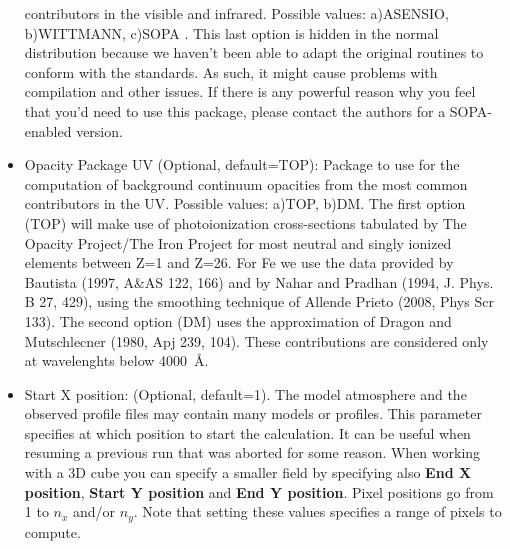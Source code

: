 \begin{itemize}
  contributors in the visible and infrared. Possible values:
  a)ASENSIO, b)WITTMANN, c)SOPA . This last option is hidden in the
  normal distribution because we haven't been able to adapt the
  original routines to conform with the standards. As such, it might
  cause problems with compilation and other issues. If there is any
  powerful reason why you feel that you'd need to use this package,
  please contact the authors for a SOPA-enabled version.
\item Opacity Package UV (Optional, default=TOP): Package to use for
  the computation of background continuum opacities from the most common
  contributors in the UV. Possible values: a)TOP, b)DM. The first
  option (TOP) will make use of photoionization cross-sections
  tabulated by The Opacity Project/The Iron Project for most neutral
  and singly ionized elements between Z=1 and Z=26. For Fe we use the
  data provided by Bautista (1997, A\&AS 122, 166) and by Nahar and
  Pradhan (1994, J. Phys. B 27, 429), using the smoothing technique of
  Allende Prieto (2008, Phys Scr 133). The second option (DM) uses the
  approximation of Dragon and Mutschlecner (1980, Apj 239, 104). These
  contributions are considered only at wavelenghts below 4000~\AA .
\item Start X position: (Optional, default=1). The model atmosphere and
  the observed profile files may contain many models or profiles. This
  parameter specifies at which position to start the calculation. It
  can be useful when resuming a previous run that was aborted for some
  reason. When working with a 3D cube you can specify a smaller field by 
  specifying also {\bf End X position}, {\bf Start Y position} and {\bf End Y position}.
  Pixel positions go from 1 to $n_x$ and/or $n_y$.
  Note that setting these values specifies a range of pixels to compute.

\end{itemize}
